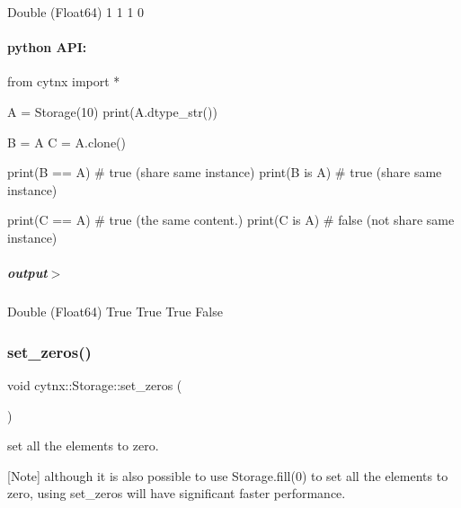 \begin{DoxyVerbInclude}
Double (Float64)
1
1
1
0
\end{DoxyVerbInclude}
 \paragraph*{python A\+PI\+:}


\begin{DoxyCodeInclude}
\textcolor{keyword}{from} cytnx \textcolor{keyword}{import} *


A = Storage(10)
print(A.dtype\_str())

B = A
C = A.clone()

print(B == A) \textcolor{comment}{# true (share same instance)}
print(B \textcolor{keywordflow}{is} A) \textcolor{comment}{# true (share same instance)}

print(C == A)  \textcolor{comment}{# true (the same content.)}
print(C \textcolor{keywordflow}{is} A)  \textcolor{comment}{# false (not share same instance)}
\end{DoxyCodeInclude}
 \subparagraph*{output$>$}


\begin{DoxyVerbInclude}
Double (Float64)
True
True
True
False
\end{DoxyVerbInclude}
 \mbox{\label{classcytnx_1_1Storage_a7e854529c99108b0acc3e5e2b185244b}} 
\subsubsection{\texorpdfstring{set\+\_\+zeros()}{set\_zeros()}}
{\footnotesize\ttfamily void cytnx\+::\+Storage\+::set\+\_\+zeros (\begin{DoxyParamCaption}{ }\end{DoxyParamCaption})\hspace{0.3cm}{\ttfamily [inline]}}



set all the elements to zero. 

\mbox{[}Note\mbox{]} although it is also possible to use Storage.\+fill(0) to set all the elements to zero, using set\+\_\+zeros will have significant faster performance. \mbox{\label{classcytnx_1_1Storage_aaf36262622abdab03c90b713c454f78e}} 
